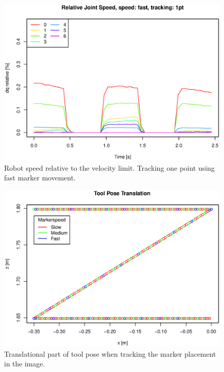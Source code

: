 \begin{figure}[H]
\centering
\includegraphics[width= \linewidth]{graphics/robotics/relativeConfVel_fast_1pt}
\caption{Robot speed relative to the velocity limit. 
Tracking one point using fast marker movement.}
\label{fig:robotspeed_fast_1p}
\end{figure}

\begin{figure}[H]
\centering
\includegraphics[width= \linewidth]{graphics/robotics/toolPose_1pt_pos}
\caption{Translational part of tool pose when tracking the marker placement in the image.}
\label{fig:toolpose_1p_pos}
\end{figure}

